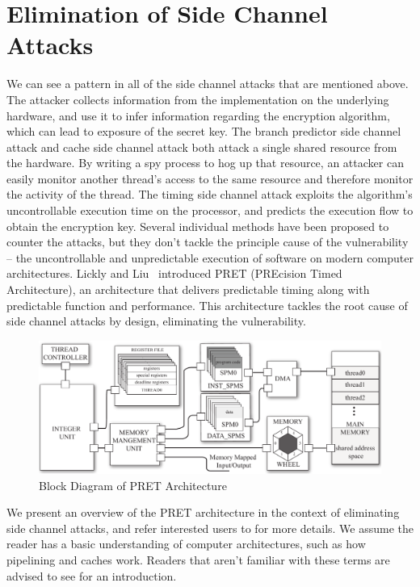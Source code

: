 \documentclass[times, 10pt,twocolumn]{article}
\begin{document}
\section{Elimination of Side Channel Attacks}
We can see a pattern in all of the side channel attacks that are mentioned above. The attacker collects information from the implementation on the underlying hardware, and use it to infer information regarding the encryption algorithm, which can lead to exposure of the secret key. The branch predictor side channel attack and cache side channel attack both attack a single shared resource from the hardware. By writing a spy process to hog up that resource, an attacker can easily monitor another thread's access to the same resource and therefore monitor the activity of the thread. The timing side channel attack exploits the algorithm's uncontrollable execution time on the processor, and predicts the execution flow to obtain the encryption key. Several individual methods have been proposed to counter the attacks, but they don't tackle the principle cause of the vulnerability -- the uncontrollable and unpredictable execution of software on modern computer architectures. Lickly and Liu~\cite{pret_cases08} introduced PRET (PREcision Timed Architecture), an architecture that delivers predictable timing along with predictable function and performance. This architecture tackles the root cause of side channel attacks by design, eliminating the vulnerability.

\begin{figure}[ht]
  \centering
  \includegraphics[scale=.25]{./images/top_arch.pdf}
  \caption{Block Diagram of PRET Architecture}
  \label{fig:top_arch}
\end{figure}

We present an overview of the PRET architecture in the context of eliminating side channel attacks, and refer interested users to \cite{pret_cases08} for more details. We assume the reader has a basic understanding of computer architectures, such as how pipelining and caches work. Readers that aren't familiar with these terms are advised to see \cite{patterson2005coa} for an introduction.
\end{document}
